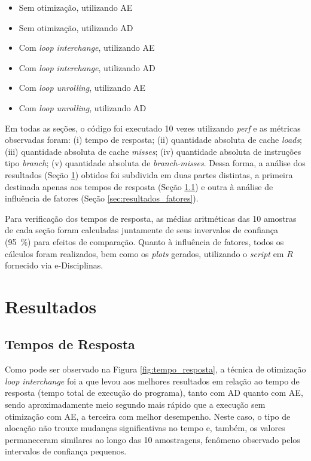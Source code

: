 \documentclass[12pt,a4paper]{article}
\begin{document}
\begin{itemize}
    \item Sem otimização, utilizando AE
    \item Sem otimização, utilizando AD
    \item Com \textit{loop interchange}, utilizando AE
    \item Com \textit{loop interchange}, utilizando AD
    \item Com \textit{loop unrolling}, utilizando AE
    \item Com \textit{loop unrolling}, utilizando AD
\end{itemize}

Em todas as seções, o código foi executado 10 vezes utilizando \textit{perf} e as métricas observadas foram: (i) tempo de resposta; (ii) quantidade absoluta de cache \textit{loads}; (iii) quantidade absoluta de cache \textit{misses}; (iv) quantidade absoluta de instruções tipo \textit{branch}; (v) quantidade absoluta de \textit{branch-misses}.  Dessa forma, a análise dos resultados (Seção \ref{sec:resultados}) obtidos foi subdivida em duas partes distintas, a primeira destinada apenas aos tempos de resposta (Seção \ref{sec:resultados_tempo}) e outra à análise de influência de fatores (Seção \ref{sec:resultados_fatores}). 

Para verificação dos tempos de resposta, as médias aritméticas das 10 amostras de cada seção foram calculadas juntamente de seus invervalos de confiança (\SI{95}{\percent}) para efeitos de comparação. Quanto à influência de fatores, todos os cálculos foram realizados, bem como os \textit{plots} gerados, utilizando o \textit{script} em $R$ fornecido via e-Disciplinas. 

\section{Resultados} \label{sec:resultados}

\subsection{Tempos de Resposta} \label{sec:resultados_tempo}

Como pode ser observado na Figura \ref{fig:tempo_resposta}, a técnica de otimização \textit{loop interchange} foi a que levou aos melhores resultados em relação ao tempo de resposta (tempo total de execução do programa), tanto com AD quanto com AE, sendo aproximadamente meio segundo mais rápido que a execução sem otimização com AE, a terceira com melhor desempenho. Neste caso, o tipo de alocação não trouxe mudanças significativas no tempo e, também, os valores permaneceram similares ao longo das 10 amostragens, fenômeno observado pelos intervalos de confiança pequenos. 
\end{document}
